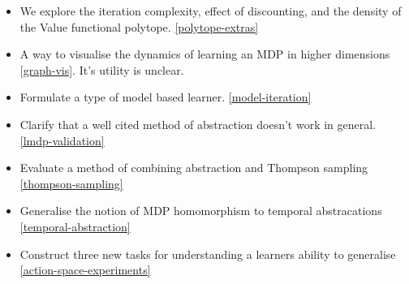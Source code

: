 \begin{itemize}
  \tightlist
  \item We explore the iteration complexity, effect of discounting, and the density of the Value functional polytope. \ref{polytope-extras}
  \item A way to visualise the dynamics of learning an MDP in higher dimensions \ref{graph-vis}. It's utility is unclear.
  \item Formulate a type of model based learner. \ref{model-iteration}
  \item Clarify that a well cited method of abstraction doesn't work in general. \ref{lmdp-validation}
  \item Evaluate a method of combining abstraction and Thompson sampling \ref{thompson-sampling}
  \item Generalise the notion of MDP homomorphism to temporal abstracations \ref{temporal-abstraction}
  \item Construct three new tasks for understanding a learners ability to generalise \ref{action-space-experiments}
\end{itemize}
